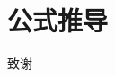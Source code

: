 \documentclass[type=master]{fduthesis}
\begin{document}


\mainmatter

%   
%   
%   








\appendix

\chapter{公式推导}

\backmatter

\printbibliography

\begin{acknowledgements}
  致谢
\end{acknowledgements}
\end{document}

